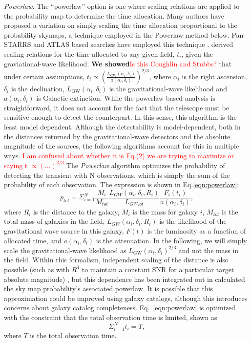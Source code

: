 \documentclass[twocolumn]{aastex62}
\begin{document}
\emph{Powerlaw.} The ``powerlaw'' option is one where scaling relations are applied to the probability map to determine the time allocation.
Many authors \citep{GhBl2016,CoSt2016a,ChHu2017} have proposed a variation on simply scaling the time allocation proportional to the probability skymaps, a technique employed in the Powerlaw method below.
Pan-STARRS and ATLAS based searches have employed this technique \citep{SmCh2016,SmCh2016b,StTo2017}.
\cite{CoSt2016a} derived scaling relations for the time allocated to any given field, $t_i$, given the graviational-wave likelihood. \textbf{We showed}\textcolor{red}{Is this Coughlin and Stubbs?} that under certain assumptions, $t_i \propto \left(\frac{L_\textrm{GW}(\alpha_i,\delta_i)}{a(\alpha_i,\delta_i)}\right)^{2/3}$, where $\alpha_i$ is the right ascension, $\delta_i$ is the declination, $L_\textrm{GW}(\alpha_i,\delta_i)$ is the gravitational-wave likelihood and $a(\alpha_i,\delta_i)$ is Galactic extinction.  While the powerlaw based analysis is straightforward, it does not account for the fact that the telescope must be sensitive enough to detect the counterpart. In this sense, this algorithm is the least model dependent. Although the detectability is model-dependent, both in the distances returned by the gravitational-wave detectors and the absolute magnitude of the sources, the following algorithms account for this in multiple ways.
\textcolor{red}{I am confused about whether it is Eq.(2) we are trying to maximize or saying t $\propto (\dots)^{2/3}$}
The \emph{Powerlaw} algorithm optimizes the probability of detecting the transient with N observations, which is simply the sum of the probability of each observation. The expression is shown in Eq.\ref{eqn:powerlaw}:
\begin{equation}\label{eqn:powerlaw}
p_{tot}=\Sigma_{i=1}^N \frac{M_i}{M_{tot}}\frac{L_{GW}(\alpha_i, \delta_i, R_i)}{L_{GW_tot}}\frac{F_i(t_i)}{a(\alpha_i, \delta_i)},
\end{equation}
where $R_i$ is the distance to the galaxy, $M_i$ is the mass for galaxy $i$, $M_{tot}$ is the total mass of galaxies in the field, $L_{GW}(\alpha_i, \delta_i, R_i)$ is the likelihood of the gravitational wave source in this galaxy, $F(t)$ is the luminosity as a function of allocated time, and $a(\alpha_i, \delta_i)$ is the attenuation. In the following, we will simply scale the gravitational-wave likelihood as $L_\textrm{GW}(\alpha_i,\delta_i)^{2/3}$ and not the mass in the field. Within this formalism, independent scaling of the distance is also possible (such as with $R^4$ to maintain a constant SNR for a particular target absolute magnitude) , but this dependence has been integrated out in calculated the sky map probability's associated powerlaw. It is possible that this approximation could be improved using galaxy catalogs, although this introduces concerns about galaxy catalog completeness. Eq.~\ref{eqn:powerlaw} is optimized with the constraint that the total observation time is limited, shown as
\begin{equation}
\Sigma_{i=1}^N t_i=T,
\end{equation}
where $T$ is the total observation time.
\end{document}
